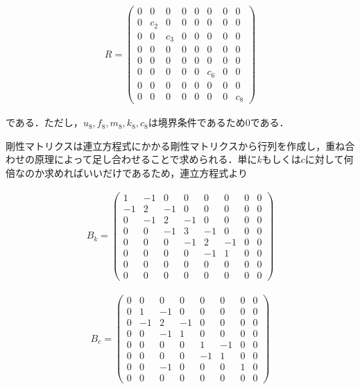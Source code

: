 \begin{eqnarray}
    R = 
    \left(\begin{matrix}
        0   & 0   & 0   & 0   & 0   & 0   & 0   & 0   \\
        0   & c_2 & 0   & 0   & 0   & 0   & 0   & 0   \\
        0   & 0   & c_3 & 0   & 0   & 0   & 0   & 0   \\
        0   & 0   & 0   & 0   & 0   & 0   & 0   & 0   \\
        0   & 0   & 0   & 0   & 0   & 0   & 0   & 0   \\
        0   & 0   & 0   & 0   & 0   & c_6 & 0   & 0   \\
        0   & 0   & 0   & 0   & 0   & 0   & 0   & 0   \\
        0   & 0   & 0   & 0   & 0   & 0   & 0   & c_8
    \end{matrix}\right)
\end{eqnarray}

である．ただし，$u_8, f_8, m_8, k_8, c_8$は境界条件であるため$0$である．

剛性マトリクスは連立方程式にかかる剛性マトリクスから行列を作成し，重ね合わせの原理によって足し合わせることで求められる．単に$k$もしくは$c$に対して何倍なのか求めればいいだけであるため，連立方程式より

\begin{eqnarray}
    B_k = 
    \left(\begin{matrix}
        1   & -1  & 0   & 0   & 0  & 0  & 0  & 0  \\
        -1  & 2   & -1  & 0   & 0  & 0  & 0  & 0  \\
        0   & -1  & 2   & -1  & 0  & 0  & 0  & 0  \\
        0   & 0   & -1  & 3   & -1 & 0  & 0  & 0  \\
        0   & 0   & 0   & -1  & 2  & -1 & 0  & 0  \\
        0   & 0   & 0   & 0   & -1 & 1  & 0  & 0  \\
        0   & 0   & 0   & 0   & 0  & 0  & 0  & 0  \\
        0   & 0   & 0   & 0   & 0  & 0  & 0  & 0  
    \end{matrix}\right)
\end{eqnarray}

\begin{eqnarray}
    B_c = 
    \left(\begin{matrix}
        0   & 0   & 0   & 0   & 0  & 0  & 0  & 0  \\
        0   & 1   & -1  & 0   & 0  & 0  & 0  & 0  \\
        0   & -1  & 2   & -1  & 0  & 0  & 0  & 0  \\
        0   & 0   & -1  & 1   & 0  & 0  & 0  & 0  \\
        0   & 0   & 0   & 0   & 1  & -1 & 0  & 0  \\
        0   & 0   & 0   & 0   & -1 & 1  & 0  & 0  \\
        0   & 0   & -1  & 0   & 0  & 0  & 1  & 0  \\
        0   & 0   & 0   & 0   & 0  & 0  & 0  & 0  
    \end{matrix}\right)
\end{eqnarray}

